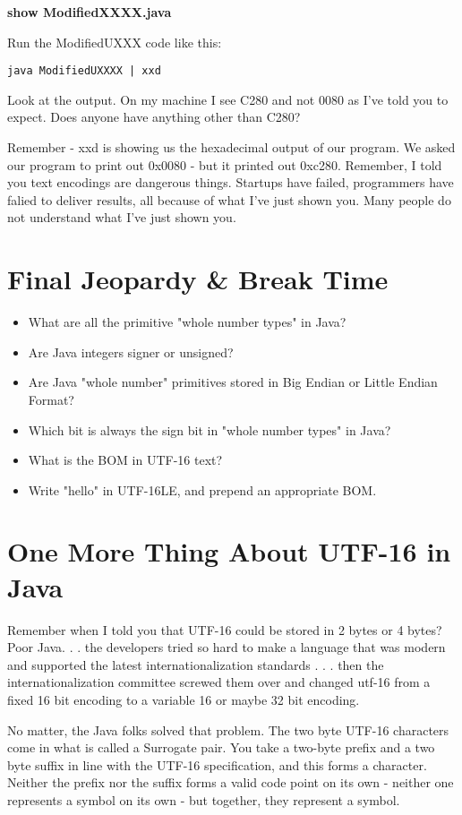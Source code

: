 \documentclass[12pt]{article}
\begin{document}
\begin{center}
\textbf{show ModifiedXXXX.java}
\end{center}

Run the ModifiedUXXX code like this:

\begin{lstlisting}
java ModifiedUXXXX | xxd
\end{lstlisting}

Look at the output. On my machine I see C280 and not 0080 as I've told you to expect. Does anyone have anything other than C280?

Remember - xxd is showing us the hexadecimal output of our program. We asked our program to print out 0x0080 - but it printed out 0xc280. Remember, I told you text encodings are dangerous things. Startups have failed, programmers have falied to deliver results, all because of what I've just shown you. Many people do not understand what I've just shown you.

\section{Final Jeopardy \& Break Time}
\begin{itemize}
\item What are all the primitive "whole number types" in Java?
\item Are Java integers signer or unsigned?
\item Are Java "whole number" primitives stored in Big Endian or Little Endian Format?
\item Which bit is always the sign bit in "whole number types" in Java?\item What is the BOM in UTF-16 text?
\item Write "hello" in UTF-16LE, and prepend an appropriate BOM.
\end{itemize}

\section {One More Thing About UTF-16 in Java}
Remember when I told you that UTF-16 could be stored in 2 bytes or 4 bytes? Poor Java. . . the developers tried so hard to make a language that was modern and supported the latest internationalization standards . . . then the internationalization committee screwed them over and changed utf-16 from a fixed 16 bit encoding to a variable 16 or maybe 32 bit encoding. 

No matter, the Java folks solved that problem. The two byte UTF-16 characters come in what is called a Surrogate pair. You take a two-byte prefix and a two byte suffix in line with the UTF-16 specification, and this forms a character. Neither the prefix nor the suffix forms a valid code point on its own - neither one represents a symbol on its own - but together, they represent a symbol. 
\end{document}
